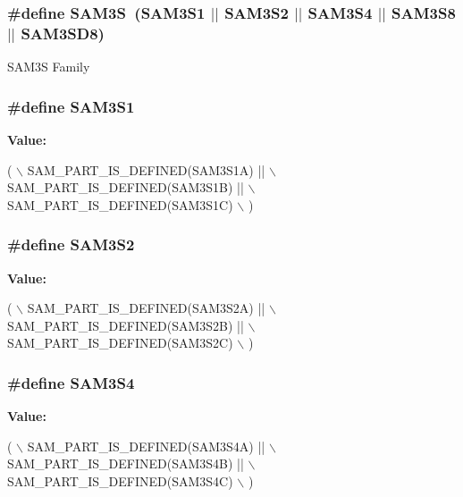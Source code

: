 \subsubsection[{S\+A\+M3\+S}]{\setlength{\rightskip}{0pt plus 5cm}\#define S\+A\+M3\+S~(S\+A\+M3\+S1 $\vert$$\vert$ S\+A\+M3\+S2 $\vert$$\vert$ S\+A\+M3\+S4 $\vert$$\vert$ S\+A\+M3\+S8 $\vert$$\vert$ S\+A\+M3\+S\+D8)}\label{group__sam__part__macros__group_gaaa8d9ee5981c67997fbdf923247bcb68}
S\+A\+M3\+S Family \hypertarget{group__sam__part__macros__group_gac1f138c6fe48b20faa71fb2d68d68b52}{}
\subsubsection[{S\+A\+M3\+S1}]{\setlength{\rightskip}{0pt plus 5cm}\#define S\+A\+M3\+S1}\label{group__sam__part__macros__group_gac1f138c6fe48b20faa71fb2d68d68b52}
{\bfseries Value\+:}
\begin{DoxyCode}
( \(\backslash\)
        SAM\_PART\_IS\_DEFINED(SAM3S1A) || \(\backslash\)
        SAM\_PART\_IS\_DEFINED(SAM3S1B) || \(\backslash\)
        SAM\_PART\_IS\_DEFINED(SAM3S1C) \(\backslash\)
        )
\end{DoxyCode}
\hypertarget{group__sam__part__macros__group_ga3665c1cc7fa5ad33231fde9e16b562cd}{}
\subsubsection[{S\+A\+M3\+S2}]{\setlength{\rightskip}{0pt plus 5cm}\#define S\+A\+M3\+S2}\label{group__sam__part__macros__group_ga3665c1cc7fa5ad33231fde9e16b562cd}
{\bfseries Value\+:}
\begin{DoxyCode}
( \(\backslash\)
        SAM\_PART\_IS\_DEFINED(SAM3S2A) || \(\backslash\)
        SAM\_PART\_IS\_DEFINED(SAM3S2B) || \(\backslash\)
        SAM\_PART\_IS\_DEFINED(SAM3S2C) \(\backslash\)
        )
\end{DoxyCode}
\hypertarget{group__sam__part__macros__group_gae92413f616568bd2f38622e20f4925e0}{}
\subsubsection[{S\+A\+M3\+S4}]{\setlength{\rightskip}{0pt plus 5cm}\#define S\+A\+M3\+S4}\label{group__sam__part__macros__group_gae92413f616568bd2f38622e20f4925e0}
{\bfseries Value\+:}
\begin{DoxyCode}
( \(\backslash\)
        SAM\_PART\_IS\_DEFINED(SAM3S4A) || \(\backslash\)
        SAM\_PART\_IS\_DEFINED(SAM3S4B) || \(\backslash\)
        SAM\_PART\_IS\_DEFINED(SAM3S4C) \(\backslash\)
        )
\end{DoxyCode}
\hypertarget{group__sam__part__macros__group_gaea8f1cca303520385d12110ad8e8bafe}{}
